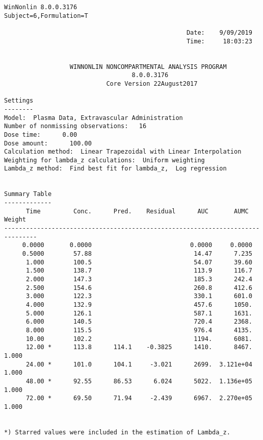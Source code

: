 \documentclass[12pt,a4paper]{article}
\begin{document}
\begin{verbatim}
WinNonlin 8.0.0.3176
Subject=6,Formulation=T

                                                  Date:    9/09/2019
                                                  Time:     18:03:23


                  WINNONLIN NONCOMPARTMENTAL ANALYSIS PROGRAM
                                   8.0.0.3176
                            Core Version 22August2017

Settings
--------
Model:  Plasma Data, Extravascular Administration
Number of nonmissing observations:   16
Dose time:      0.00
Dose amount:      100.00
Calculation method:  Linear Trapezoidal with Linear Interpolation
Weighting for lambda_z calculations:  Uniform weighting
Lambda_z method:  Find best fit for lambda_z,  Log regression


Summary Table
-------------
      Time         Conc.      Pred.    Residual      AUC       AUMC      Weight
-------------------------------------------------------------------------------
     0.0000       0.0000                           0.0000     0.0000
     0.5000        57.88                            14.47      7.235
      1.000        100.5                            54.07      39.60
      1.500        138.7                            113.9      116.7
      2.000        147.3                            185.3      242.4
      2.500        154.6                            260.8      412.6
      3.000        122.3                            330.1      601.0
      4.000        132.9                            457.6      1050.
      5.000        126.1                            587.1      1631.
      6.000        140.5                            720.4      2368.
      8.000        115.5                            976.4      4135.
      10.00        102.2                            1194.      6081.
      12.00 *      113.8      114.1    -0.3825      1410.      8467.      1.000
      24.00 *      101.0      104.1     -3.021      2699.  3.121e+04      1.000
      48.00 *      92.55      86.53      6.024      5022.  1.136e+05      1.000
      72.00 *      69.50      71.94     -2.439      6967.  2.270e+05      1.000


*) Starred values were included in the estimation of Lambda_z.



\end{verbatim}
\end{document}
